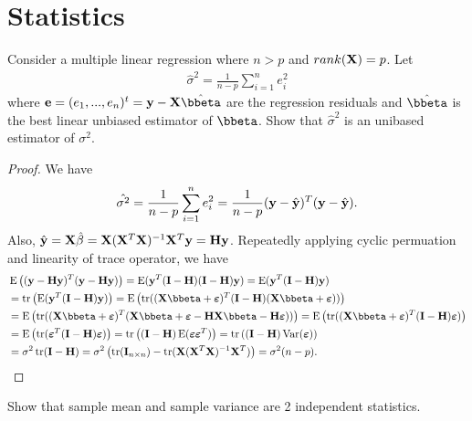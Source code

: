 \section{Statistics}

\begin{problembox}{}{}
Consider a multiple linear regression where $n > p$ and $rank(\mathbf{X}) = p$. Let
\begin{align*}
	\hat{\sigma}^2 = \frac{1}{n-p}\sum_{i=1}^{n}e_i^2
\end{align*}
where $\be = (e_1,...,e_n)^t = \by - \bX\hat{\bbeta}$ are the regression residuals and $\hat{\bbeta}$ is the best linear unbiased estimator of $\bbeta$. Show that $\hat{\sigma}^2$ is an unibased estimator of $\sigma^2.$
\end{problembox}

\begin{proof}
We have
\begin{align*}
	\hat{\sigma^2} = \frac{1}{n-p}\sum_{i=1}^{n}e_i^2 = \frac{1}{n-p} (\mathbf{y} - \hat{\mathbf{y}})^T(\mathbf{y} - \hat{\mathbf{y}}).
\end{align*}
Also, $\hat{\mathbf{y}} = \mathbf{X}\hat{\beta} = \mathbf{X}(\mathbf{X}^T\mathbf{X})^{-1}\mathbf{X}^T\mathbf{y} = \mathbf{H}\mathbf{y}$. Repeatedly applying cyclic permuation and linearity of trace operator, we have
\begin{align*}
 &\E\left( (\by - \bH\by)^T(\by - \bH\by) \right) = \E(\by^T(\bI - \bH)(\bI - \bH)\by) = \E(\by^T(\bI-\bH)\by) \\
 &= \tr \left( \E(\by^T(\bI-\bH)\by)\right) = \E \left( \tr((\bX\bbeta + \bepsilon)^T(\bI-\bH)(\bX\bbeta + \bepsilon))\right) \\
&= \E \left( \tr((\bX\bbeta + \bepsilon)^T(\bX\bbeta + \bepsilon - \bH\bX\bbeta - \bH \bepsilon))\right) = \E \left( \tr((\bX\bbeta + \bepsilon)^T(\bI-\bH) \bepsilon)\right) \\
&= \E \left( \tr( \bepsilon^T(\bI-\bH)\bepsilon)\right) = \tr\left( (\bI - \bH)\E(\bepsilon\bepsilon^T)\right) = \tr\left((\bI-\bH)\Var(\bepsilon)\right)\\
&= \sigma^2\tr(\bI - \bH) = \sigma^2\left(\tr(\bI_{n \times n}) - \tr(\bX(\bX^T\bX)^{-1}\bX^T)\right) = \sigma^2 (n - p).
\end{align*}
\end{proof}

\begin{problembox}{}{}
Show that sample mean and sample variance are 2 independent statistics. 
\end{problembox}